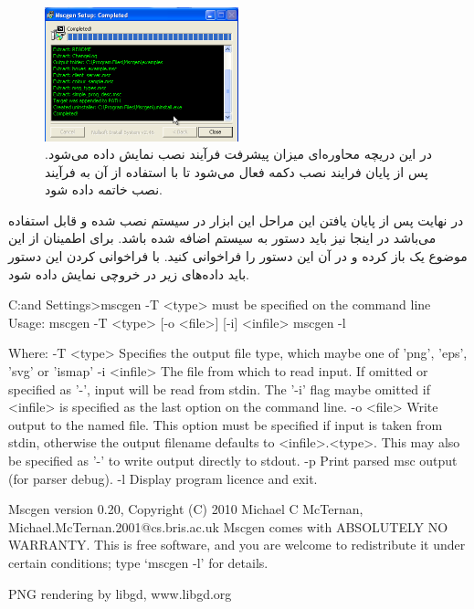 \begin{figure}
	\centering
	\includegraphics[width=0.5\textwidth]{images/write/graph/mscgen/install-win-3}
	\caption[پیشرفت فرآیند نصب  در ویندوز]{
		در این دریچه محاوره‌ای میزان پیشرفت فرآیند نصب نمایش داده می‌شود. پس از پایان
		فرایند نصب دکمه  فعال می‌شود تا با استفاده از آن به فرآیند نصب خاتمه
		داده شود.
		}
	\label{images/write/graph/mscgen/install-win-3}
\end{figure}

در نهایت پس از پایان یافتن این مراحل این ابزار در سیستم نصب شده و قابل استفاده
می‌باشد در اینجا نیز باید دستور  به سیستم اضافه شده باشد. برای
اطمینان از این موضوع یک  باز کرده و در آن این دستور را فراخوانی کنید. با
فراخوانی کردن این دستور باید داده‌های زیر در خروچی نمایش داده شود.

\begin{Shell}
C:\Documents and Settings\malek>mscgen
-T <type> must be specified on the command line
Usage: mscgen -T <type> [-o <file>] [-i] <infile>
       mscgen -l

Where:
 -T <type>   Specifies the output file type, which maybe one of 'png', 'eps',
             'svg' or 'ismap'
 -i <infile> The file from which to read input.  If omitted or specified as
              '-', input will be read from stdin.  The '-i' flag maybe
              omitted if <infile> is specified as the last option on the
              command line.
 -o <file>   Write output to the named file.  This option must be specified if
              input is taken from stdin, otherwise the output filename
              defaults to <infile>.<type>.  This may also be specified as '-'
              to write output directly to stdout.
 -p          Print parsed msc output (for parser debug).
 -l          Display program licence and exit.

Mscgen version 0.20, Copyright (C) 2010 Michael C McTernan,
                                        Michael.McTernan.2001@cs.bris.ac.uk
Mscgen comes with ABSOLUTELY NO WARRANTY.  This is free software, and you are
welcome to redistribute it under certain conditions; type `mscgen -l' for
details.

PNG rendering by libgd, www.libgd.org
\end{Shell}

